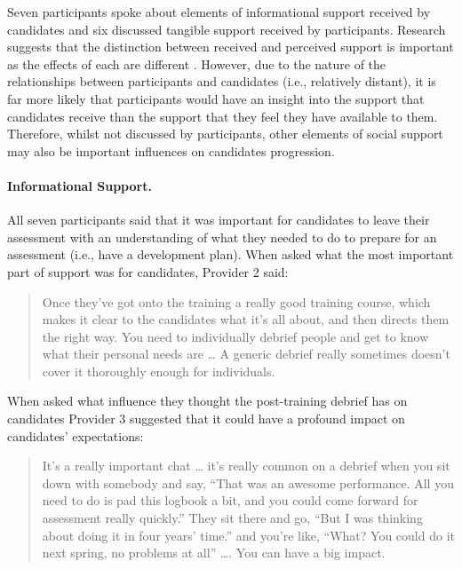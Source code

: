 \documentclass[
  12pt,
  a4paper,
]{book}
\begin{document}
Seven participants spoke about elements of informational support received by candidates and six discussed tangible support received by participants. Research suggests that the distinction between received and perceived support is important as the effects of each are different \citep[cf.~][]{Rees2007}. However, due to the nature of the relationships between participants and candidates (i.e., relatively distant), it is far more likely that participants would have an insight into the support that candidates receive than the support that they feel they have available to them. Therefore, whilst not discussed by participants, other elements of social support may also be important influences on candidates progression.

\hypertarget{qual-gta-development-plan}{%
\paragraph{Informational Support.}\label{qual-gta-development-plan}}

All seven participants said that it was important for candidates to leave their assessment with an understanding of what they needed to do to prepare for an assessment (i.e., have a development plan). When asked what the most important part of support was for candidates, Provider 2 said:

\begin{quote}
Once they've got onto the training a really good training course, which makes it clear to the candidates what it's all about, and then directs them the right way. You need to individually debrief people and get to know what their personal needs are \ldots{} A generic debrief really sometimes doesn't cover it thoroughly enough for individuals.
\end{quote}

When asked what influence they thought the post-training debrief has on candidates Provider 3 suggested that it could have a profound impact on candidates' expectations:

\begin{quote}
It's a really important chat \ldots{} it's really common on a debrief when you sit down with somebody and say, ``That was an awesome performance. All you need to do is pad this logbook a bit, and you could come forward for assessment really quickly.'' They sit there and go, ``But I was thinking about doing it in four years' time.'' and you're like, ``What? You could do it next spring, no problems at all'' \ldots. You can have a big impact.
\end{quote}
\end{document}
